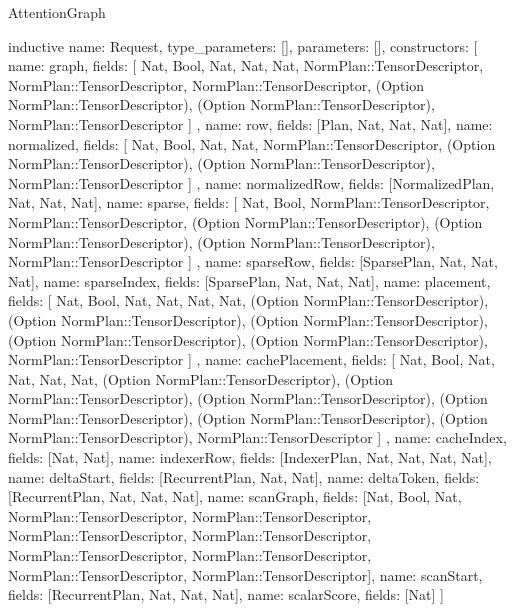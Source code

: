 \begin{lexlean}{AttentionGraph}
\begin{semanticmodule}
inductive{
  name: Request,
  type_parameters: [],
  parameters: [],
  constructors: [
    {
      name: graph,
      fields: [
        Nat,
        Bool,
        Nat,
        Nat,
        Nat,
        NormPlan::TensorDescriptor,
        NormPlan::TensorDescriptor,
        NormPlan::TensorDescriptor,
        (Option NormPlan::TensorDescriptor),
        (Option NormPlan::TensorDescriptor),
        NormPlan::TensorDescriptor
      ]
    },
    {name: row, fields: [Plan, Nat, Nat, Nat]},
    {
      name: normalized,
      fields: [
        Nat,
        Bool,
        Nat,
        Nat,
        NormPlan::TensorDescriptor,
        (Option NormPlan::TensorDescriptor),
        (Option NormPlan::TensorDescriptor),
        NormPlan::TensorDescriptor
      ]
    },
    {name: normalizedRow, fields: [NormalizedPlan, Nat, Nat, Nat]},
    {
      name: sparse,
      fields: [
        Nat,
        Bool,
        NormPlan::TensorDescriptor,
        NormPlan::TensorDescriptor,
        (Option NormPlan::TensorDescriptor),
        (Option NormPlan::TensorDescriptor),
        (Option NormPlan::TensorDescriptor),
        NormPlan::TensorDescriptor
      ]
    },
    {name: sparseRow, fields: [SparsePlan, Nat, Nat, Nat]},
    {name: sparseIndex, fields: [SparsePlan, Nat, Nat, Nat]},
    {
      name: placement,
      fields: [
        Nat,
        Bool,
        Nat,
        Nat,
        Nat,
        Nat,
        (Option NormPlan::TensorDescriptor),
        (Option NormPlan::TensorDescriptor),
        (Option NormPlan::TensorDescriptor),
        (Option NormPlan::TensorDescriptor),
        (Option NormPlan::TensorDescriptor),
        NormPlan::TensorDescriptor
      ]
    },
    {
      name: cachePlacement,
      fields: [
        Nat,
        Bool,
        Nat,
        Nat,
        Nat,
        Nat,
        (Option NormPlan::TensorDescriptor),
        (Option NormPlan::TensorDescriptor),
        (Option NormPlan::TensorDescriptor),
        (Option NormPlan::TensorDescriptor),
        (Option NormPlan::TensorDescriptor),
        (Option NormPlan::TensorDescriptor),
        NormPlan::TensorDescriptor
      ]
    },
    {name: cacheIndex, fields: [Nat, Nat]},
    {name: indexerRow, fields: [IndexerPlan, Nat, Nat, Nat, Nat]},
    {name: deltaStart, fields: [RecurrentPlan, Nat, Nat]},
    {name: deltaToken, fields: [RecurrentPlan, Nat, Nat, Nat]},
    {name: scanGraph, fields: [Nat, Bool, Nat, NormPlan::TensorDescriptor, NormPlan::TensorDescriptor, NormPlan::TensorDescriptor, NormPlan::TensorDescriptor, NormPlan::TensorDescriptor, NormPlan::TensorDescriptor, NormPlan::TensorDescriptor, NormPlan::TensorDescriptor]},
    {name: scanStart, fields: [RecurrentPlan, Nat, Nat, Nat]},
    {name: scalarScore, fields: [Nat]}
  ]
}


\end{semanticmodule}
\end{lexlean}
